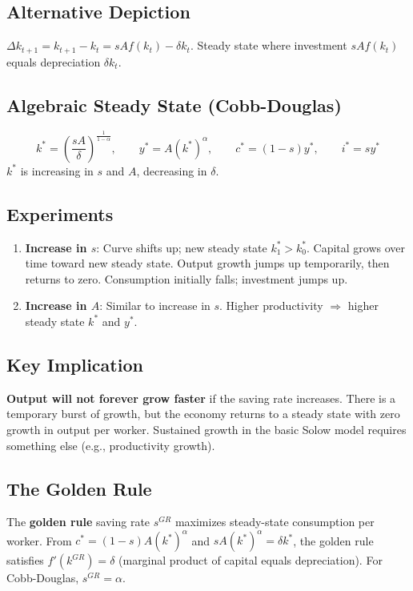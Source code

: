 \documentclass[12pt]{article}
\begin{document}
\subsection{Alternative Depiction}
$\Delta k_{t+1} = k_{t+1} - k_t = s A f(k_t) - \delta k_t$. Steady state where investment $sAf(k_t)$ equals depreciation $\delta k_t$.

\subsection{Algebraic Steady State (Cobb-Douglas)}
\begin{equation}
    k^* = \left( \frac{sA}{\delta} \right)^{\frac{1}{1-\alpha}}, \qquad
    y^* = A (k^*)^{\alpha}, \qquad
    c^* = (1-s) y^*, \qquad
    i^* = s y^*
\end{equation}
$k^*$ is increasing in $s$ and $A$, decreasing in $\delta$.

\subsection{Experiments}
\begin{enumerate}
    \item \textbf{Increase in $s$}: Curve shifts up; new steady state $k_1^* > k_0^*$. Capital grows over time toward new steady state. Output growth jumps up temporarily, then returns to zero. Consumption initially falls; investment jumps up.
    \item \textbf{Increase in $A$}: Similar to increase in $s$. Higher productivity $\Rightarrow$ higher steady state $k^*$ and $y^*$.
\end{enumerate}

\subsection{Key Implication}
\textbf{Output will not forever grow faster} if the saving rate increases. There is a temporary burst of growth, but the economy returns to a steady state with zero growth in output per worker. Sustained growth in the basic Solow model requires something else (e.g., productivity growth).

\subsection{The Golden Rule}
The \textbf{golden rule} saving rate $s^{GR}$ maximizes steady-state consumption per worker. From $c^* = (1-s) A (k^*)^{\alpha}$ and $s A (k^*)^{\alpha} = \delta k^*$, the golden rule satisfies $f'(k^{GR}) = \delta$ (marginal product of capital equals depreciation). For Cobb-Douglas, $s^{GR} = \alpha$.
\end{document}
